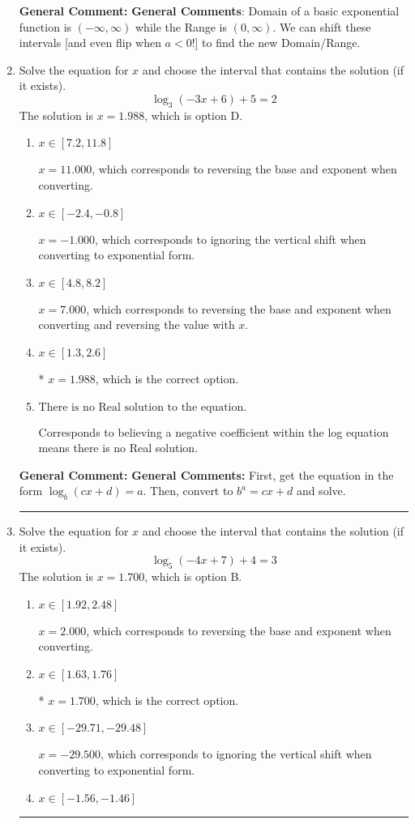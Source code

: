\documentclass{extbook}[14pt]
\newcommand{\litem}[1]{\item #1

\rule{\textwidth}{0.4pt}}
\begin{document}
\begin{enumerate}
{\textbf{General Comment:} \textbf{General Comments}: Domain of a basic exponential function is $(-\infty, \infty)$ while the Range is $(0, \infty)$. We can shift these intervals [and even flip when $a<0$!] to find the new Domain/Range.
}
\litem{
Solve the equation for $x$ and choose the interval that contains the solution (if it exists).
\[ \log_{3}{(-3x+6)}+5 = 2 \]The solution is \( x = 1.988 \), which is option D.\begin{enumerate}[label=\Alph*.]
\item \( x \in [7.2, 11.8] \)

$x = 11.000$, which corresponds to reversing the base and exponent when converting.
\item \( x \in [-2.4, -0.8] \)

$x = -1.000$, which corresponds to ignoring the vertical shift when converting to exponential form.
\item \( x \in [4.8, 8.2] \)

$x = 7.000$, which corresponds to reversing the base and exponent when converting and reversing the value with $x$.
\item \( x \in [1.3, 2.6] \)

* $x = 1.988$, which is the correct option.
\item \( \text{There is no Real solution to the equation.} \)

Corresponds to believing a negative coefficient within the log equation means there is no Real solution.
\end{enumerate}

\textbf{General Comment:} \textbf{General Comments:} First, get the equation in the form $\log_b{(cx+d)} = a$. Then, convert to $b^a = cx+d$ and solve.
}
\litem{
Solve the equation for $x$ and choose the interval that contains the solution (if it exists).
\[ \log_{5}{(-4x+7)}+4 = 3 \]The solution is \( x = 1.700 \), which is option B.\begin{enumerate}[label=\Alph*.]
\item \( x \in [1.92, 2.48] \)

$x = 2.000$, which corresponds to reversing the base and exponent when converting.
\item \( x \in [1.63, 1.76] \)

* $x = 1.700$, which is the correct option.
\item \( x \in [-29.71, -29.48] \)

$x = -29.500$, which corresponds to ignoring the vertical shift when converting to exponential form.
\item \( x \in [-1.56, -1.46] \)


\end{enumerate}}
\end{enumerate}
\end{document}
